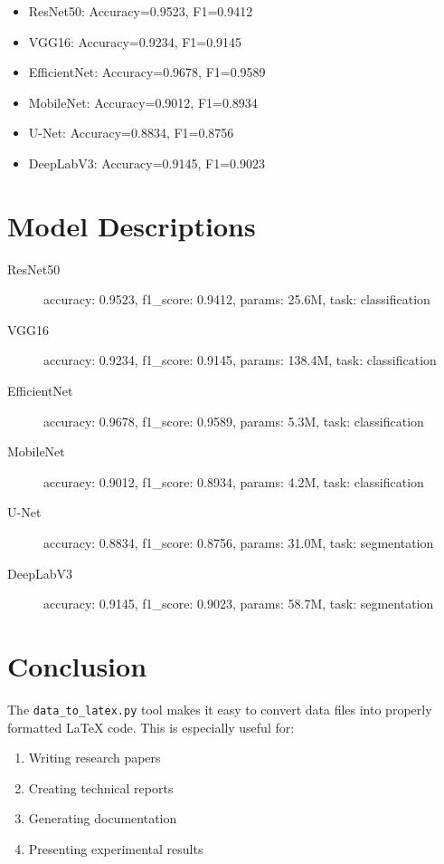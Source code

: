 \documentclass{article}
\begin{document}

\begin{itemize}
  \item ResNet50: Accuracy=0.9523, F1=0.9412
  \item VGG16: Accuracy=0.9234, F1=0.9145
  \item EfficientNet: Accuracy=0.9678, F1=0.9589
  \item MobileNet: Accuracy=0.9012, F1=0.8934
  \item U-Net: Accuracy=0.8834, F1=0.8756
  \item DeepLabV3: Accuracy=0.9145, F1=0.9023
\end{itemize}

\section{Model Descriptions}


\begin{description}
  \item[ResNet50] accuracy: 0.9523, f1\_score: 0.9412, params: 25.6M, task: classification
  \item[VGG16] accuracy: 0.9234, f1\_score: 0.9145, params: 138.4M, task: classification
  \item[EfficientNet] accuracy: 0.9678, f1\_score: 0.9589, params: 5.3M, task: classification
  \item[MobileNet] accuracy: 0.9012, f1\_score: 0.8934, params: 4.2M, task: classification
  \item[U-Net] accuracy: 0.8834, f1\_score: 0.8756, params: 31.0M, task: segmentation
  \item[DeepLabV3] accuracy: 0.9145, f1\_score: 0.9023, params: 58.7M, task: segmentation
\end{description}

\section{Conclusion}

The \texttt{data\_to\_latex.py} tool makes it easy to convert data files 
into properly formatted LaTeX code. This is especially useful for:

\begin{enumerate}
  \item Writing research papers
  \item Creating technical reports
  \item Generating documentation
  \item Presenting experimental results
\end{enumerate}
\end{document}
